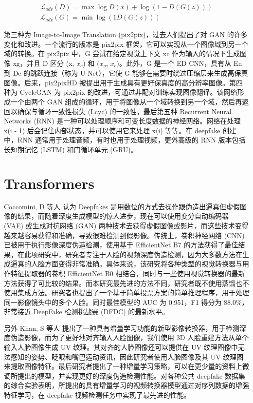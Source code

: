 $$
\begin{gathered}
\mathcal{L}_{a d v}(D)=\max \log D(x)+\log (1-D(G(z))) \\
\mathcal{L}_{a d v}(G)=\min \log (1 D(G(z)))
\end{gathered}
$$

第三种为 Image-to-Image Translation (pix2pix)，过去人们提出了对 GAN 的许多变化和改进。一个流行的版本是 pix2pix 框架，它可以实现从一个图像域到另一个域的转换。在 pix2pix 中，G 尝试在给定视觉上下文 xc 作为输入的情况下生成图像 xg，并且 D 区分 (x, $x_c$) 和 ($x_g$, $x_c$)。此外，G 是一个 ED CNN，具有从 En 到 De 的跳跃连接（称为 U-Net），它使 G 能够在需要时绕过压缩层来生成高保真图像。后来，pix2pixHD 被提出用于生成具有更好保真度的高分辨率图像。第四种为 CycleGAN 为 pix2pix 的改进，可通过非配对训练实现图像翻译。该网络形成一个由两个 GAN 组成的循环，用于将图像从一个域转换到另一个域，然后再返回以确保与循环一致性损失 (Lcyc) 的一致性，最后第五种 Recurrent Neural Networks (RNN) 是一种可以处理顺序和可变长度数据的神经网络。网络在处理 x(i - 1) 后会记住内部状态，并可以使用它来处理 x(i) 等等。在 deepfake 创建中，RNN 通常用于处理音频，有时也用于处理视频，更外高级的 RNN 版本包括长短期记忆 (LSTM) 和门循环单元 (GRU)。



\section{Transformers}

Coccomini, D 等人 \cite{coccomini2021combining} 认为 Deepfakes 是用数位的方式去操作跟伪造出逼真但虚假图像的结果，而随着深度生成模型的惊人进步，现在可以使用变分自动编码器 (VAE) 或生成对抗网络 (GAN) 两种技术去获得虚假图像或影片，而这些技术变得越来越容易获得和准确，导致很难检测到假影像。传统上，卷积神经网络 (CNN) 已被用于执行影像深度伪造检测，使用基于 EfficientNet B7 的方法获得了最佳结果，在此项研究中，研究者专注于人脸的视频深度伪造检测，因为大多数方法在生成逼真的人脸方面变得非常准确。具体来说，该研究将各种类型的视觉转换器与用作特征提取器的卷积 EfficientNet B0 相结合，同时与一些使用视觉转换器的最新方法获得了可比较的结果。而本研究最先进的方法不同，研究者既不使用蒸馏也不使用集成方法。研究者也提出了一个基于简单投票方案的简单推理程序，用于处理同一影像镜头中的多个人脸。同时最佳模型的 AUC 为 0.951，F1 得分为 88.0\%，非常接近 DeepFake 检测挑战赛 (DFDC) 的最新水平。

另外 Khan, S 等人 \cite{khan2021video} 提出了一种具有增量学习功能的新型影像转换器，用于检测深度伪造影像，而为了更好地对齐输入人脸图像，我们使用 3D 人脸重建方法从单个输入人脸图像生成 UV 纹理。其对齐的人脸图像还可以提供在 UV 纹理图像中无法感知的姿势、眨眼和嘴巴运动资讯，因此研究者使用人脸图像及其 UV 纹理图来提取图像特征。最后研究者提出了一种增量学习策略，可以在更少量的资料上微调所提出的模型，并实现更好的深度伪造检测性能。对各种公共 deepfake 数据集的综合实验表明，所提出的具有增量学习的视频转换器模型通过对序列数据的增强特征学习，在 deepfake 视频检测任务中实现了最先进的性能。

